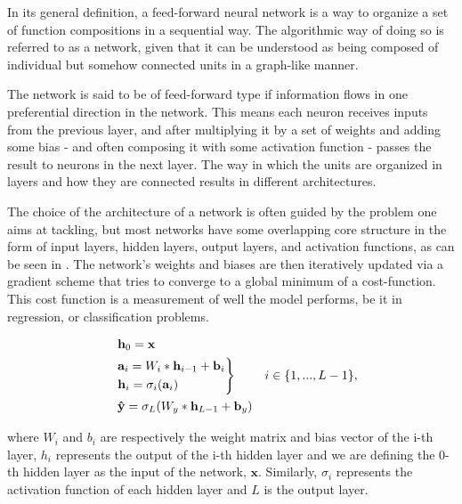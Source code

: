 In its general definition, a feed-forward neural network is a way to organize a set of function compositions in a sequential way. The algorithmic way of doing so is referred to as a network, given that it can be understood as being composed of individual but somehow connected units in a graph-like manner. 

The network is said to be of feed-forward type if information flows in one preferential direction in the network. This means each neuron receives inputs from the previous layer, and after multiplying it by a set of weights and adding some bias - and often composing it with some activation function - passes the result to neurons in the next layer. The way in which the units are organized in layers and how they are connected results in different architectures. 

The choice of the architecture of a network is often guided by the problem one aims at tackling, but most networks have some overlapping core structure in the form of input layers, hidden layers, output layers, and activation functions, as can be seen in . The network's weights and biases are then iteratively updated via a gradient scheme that tries to converge to a global minimum of a cost-function. This cost function is a measurement of well the model performs, be it in regression, or classification problems.


\begin{align}
&            && \mathbf{h}_0 = \mathbf{x} \notag\\
&            && 
                \negthickspace%
                \begin{rcases}  
                \mathbf{a}_i= W_i * \mathbf{h}_{i-1} + \mathbf{b}_i \notag\\
                \mathbf{h}_i    = \sigma_i(\mathbf{a}_i) 
                    \end{rcases}&  i \in \{1, ..., L-1\}, \\
&            &&\mathbf{\hat{y}} = \sigma_L(W_y *\mathbf{h}_{L-1} + \mathbf{b}_y) 
\label{eq:FFN}
\end{align}

where $W_i$ and $b_i$ are respectively the weight matrix and bias vector of the i-th layer, $h_i$ represents the output of the i-th hidden layer and we are defining the 0-th hidden layer as the input of the network, $\mathbf{x}$. Similarly, $\sigma_i$ represents the activation function of each hidden layer and $L$ is the output layer. 

